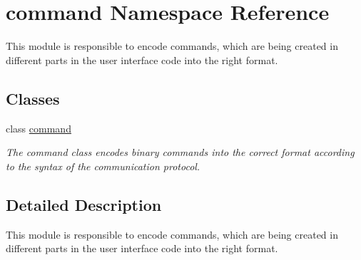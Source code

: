 \hypertarget{namespacecommand}{}\section{command Namespace Reference}
\label{namespacecommand}


This module is responsible to encode commands, which are being created in different parts in the user interface code into the right format.  


\subsection*{Classes}
\begin{DoxyCompactItemize}
\item 
class \hyperlink{classcommand_1_1command}{command}
\begin{DoxyCompactList}\small\item\em The command class encodes binary commands into the correct format according to the syntax of the communication protocol. \end{DoxyCompactList}\end{DoxyCompactItemize}


\subsection{Detailed Description}
This module is responsible to encode commands, which are being created in different parts in the user interface code into the right format. 

